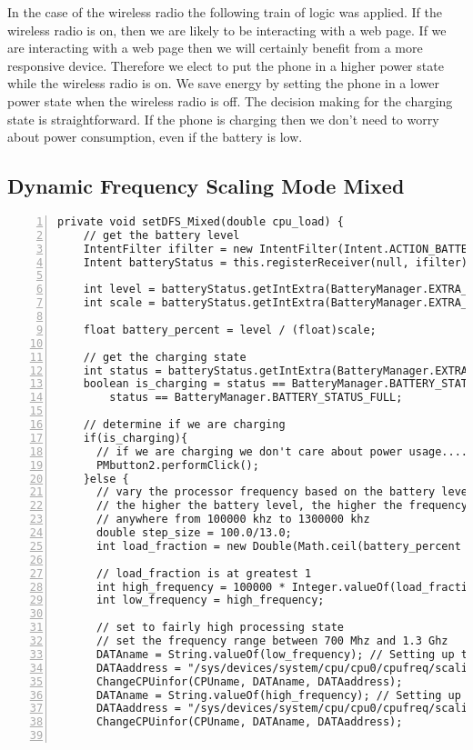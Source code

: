 \documentclass{article} %
\begin{document}
In the case of the wireless radio the following train of logic was applied. If the wireless radio is on, then we are likely to be interacting with a web page. If we are interacting with a web page then we will certainly benefit from a more responsive device. Therefore we elect to put the phone in a higher power state while the wireless radio is on. We save energy by setting the phone in a lower power state when the wireless radio is off.
The decision making for the charging state is straightforward. If the phone is charging then we don't need to worry about power consumption, even if the battery is low.

\subsection{Dynamic Frequency Scaling Mode Mixed}
\begin{lstlisting}[float=*,caption={Dynamic Frequency Scaling Mode Mixed},label={lst:DFS_mixed},numbers=left]
private void setDFS_Mixed(double cpu_load) {
    // get the battery level
    IntentFilter ifilter = new IntentFilter(Intent.ACTION_BATTERY_CHANGED);
    Intent batteryStatus = this.registerReceiver(null, ifilter);

    int level = batteryStatus.getIntExtra(BatteryManager.EXTRA_LEVEL, -1);
    int scale = batteryStatus.getIntExtra(BatteryManager.EXTRA_SCALE, -1);

    float battery_percent = level / (float)scale;

    // get the charging state
    int status = batteryStatus.getIntExtra(BatteryManager.EXTRA_STATUS, -1);
    boolean is_charging = status == BatteryManager.BATTERY_STATUS_CHARGING ||
        status == BatteryManager.BATTERY_STATUS_FULL;

    // determine if we are charging
    if(is_charging){
      // if we are charging we don't care about power usage.... set to high performance mode
      PMbutton2.performClick();
    }else {
      // vary the processor frequency based on the battery level.
      // the higher the battery level, the higher the frequency.
      // anywhere from 100000 khz to 1300000 khz
      double step_size = 100.0/13.0;
      int load_fraction = new Double(Math.ceil(battery_percent / step_size)).intValue();

      // load_fraction is at greatest 1
      int high_frequency = 100000 * Integer.valueOf(load_fraction * 13);
      int low_frequency = high_frequency;

      // set to fairly high processing state
      // set the frequency range between 700 Mhz and 1.3 Ghz
      DATAname = String.valueOf(low_frequency); // Setting up the minimum frequency at low frequency
      DATAaddress = "/sys/devices/system/cpu/cpu0/cpufreq/scaling_min_freq";
      ChangeCPUinfor(CPUname, DATAname, DATAaddress);
      DATAname = String.valueOf(high_frequency); // Setting up the maximum frequency at high frequency
      DATAaddress = "/sys/devices/system/cpu/cpu0/cpufreq/scaling_max_freq";
      ChangeCPUinfor(CPUname, DATAname, DATAaddress);


\end{lstlisting}
\end{document}
